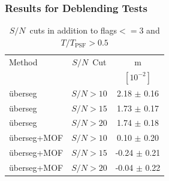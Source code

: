 \documentclass{beamer}
\newcommand{\snr}{$S/N$}
\newcommand{\uberseg}{{\"u}berseg}
\begin{document}
\frame
{

    \frametitle{Results for Deblending Tests}

    \begin{table}
        \centering
        \begin{tabular}{ l c c}
            \hline
            Method         & \snr\ Cut & m            \\
                       &           & $[10^{-2}]$  \\
            \hline
            \hline

            \uberseg       & \snr$ > 10$ & 2.18 $\pm$ 0.16  \\
            \uberseg       & \snr$ > 15$ & 1.73 $\pm$ 0.17  \\
            \uberseg       & \snr$ > 20$ & 1.74 $\pm$ 0.18  \\


            \hline

            \uberseg+MOF   & \snr$ > 10$ & 0.10 $\pm$ 0.20  \\
            \uberseg+MOF   & \snr$ > 15$ & -0.24 $\pm$ 0.21 \\
            \uberseg+MOF   & \snr$ > 20$ & -0.04 $\pm$ 0.22 \\



            \hline
        \end{tabular}

        \caption{\snr\ cuts in addition to flags$<= 3$ and
        $T/T_{\mathrm{PSF}} > 0.5$}
    \end{table}


}
\end{document}
